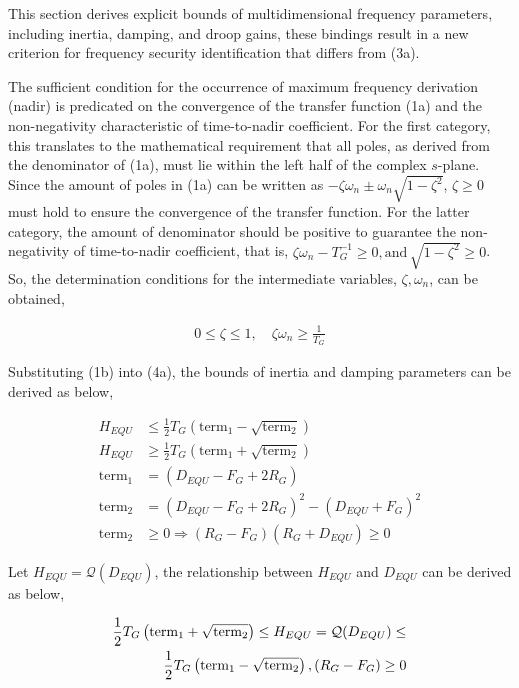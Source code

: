 \documentclass[lettersize,journal]{IEEEtran}
\begin{document}
This section derives explicit bounds of multidimensional frequency parameters, including inertia, damping, and droop gains, these bindings result in a new criterion for frequency security identification that differs from (3a).

The sufficient condition for the occurrence of maximum frequency derivation (nadir) is predicated on the convergence of the transfer function (1a) and the non-negativity characteristic of time-to-nadir coefficient. For the first category, this translates to the mathematical requirement that all poles, as derived from the denominator of (1a), must lie within the left half of the complex $s$-plane. Since the amount of poles in (1a) can be written as $-\zeta \omega_n \pm \omega_n \sqrt{1 - \zeta^2}$, $\zeta \geq 0$ must hold to ensure the convergence of the transfer function. For the latter category, the amount of denominator should be positive to guarantee the non-negativity of time-to-nadir coefficient, that is, $\zeta \omega_n - T_G^{-1}\geq 0, \text{and}\, \sqrt{1-\zeta^2} \geq 0$. So, the determination conditions for the intermediate variables, $\zeta, \omega_n$, can be obtained,

\begin{subequations}
  \begin{align}
    0 \leq \zeta \leq 1, \quad \zeta \omega_n \geq \frac{1}{T_G} \label{eq:zeta_wn}
    \end{align}
  \end{subequations}

Substituting (1b) into (4a), the bounds of inertia and damping parameters can be derived as below,

\begin{subequations}
  \begin{align}
    H_{EQU} &\leq \frac{1}{2}T_G \left(\text{term}_1 - \sqrt{\text{term}_2} \right) \\
    H_{EQU} &\geq \frac{1}{2}T_G \left(\text{term}_1 + \sqrt{\text{term}_2} \right) \\
    \text{term}_1 &= (D_{EQU} - F_G + 2R_G) \\
    \text{term}_2 &= {(D_{EQU} - F_G + 2R_G)^2 - (D_{EQU} + F_G)^2}\\
    \text{term}_2 &\geq 0 \Longrightarrow (R_G - F_G)(R_G + D_{EQU}) \geq 0
    \end{align}
  \end{subequations}

Let $H_{EQU}=\mathcal{Q} (D_{EQU})$, the relationship between $H_{EQU}$ and $D_{EQU}$ can be derived as below,

\begin{subequations}
  \begin{align}
    \frac{1}{2}T_G \left(\text{term}_1 + \sqrt{\text{term}_2} \right) \leq H_{EQU}=\mathcal{Q} (D_{EQU}) \leq \notag \\
    \frac{1}{2}T_G \left(\text{term}_1 - \sqrt{\text{term}_2} \right), (R_G - F_G) \geq 0
    \end{align}
  \end{subequations}
\end{document}
